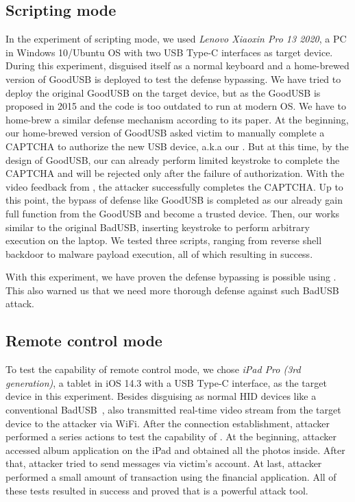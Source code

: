 \subsection{Scripting mode}
In the experiment of scripting mode, we used \textit{Lenovo Xiaoxin Pro 13 2020}, a PC in Windows 10/Ubuntu OS with two USB Type-C interfaces as target device.
During this experiment, \tool disguised itself as a normal keyboard and a home-brewed version of GoodUSB\cite{tian2015defending} is deployed to test the defense bypassing. We have tried to deploy the original GoodUSB on the target device, but as the GoodUSB is proposed in 2015 and the code is too outdated to run at modern OS. We have to home-brew a similar defense mechanism according to its paper.
At the beginning, our home-brewed version of GoodUSB asked victim to manually complete a CAPTCHA to  authorize the new USB device, a.k.a our \tool. But at this time, by the design of GoodUSB, our \tool can already perform limited keystroke to complete the CAPTCHA and will be rejected only after the failure of authorization. With the video feedback from \tool, the attacker successfully completes the CAPTCHA.
Up to this point, the bypass of defense like GoodUSB is completed as our \tool already gain full function from the GoodUSB and become a trusted device. Then, our \tool works similar to the original BadUSB, inserting keystroke to perform arbitrary execution on the laptop. We tested three scripts, ranging from reverse shell backdoor to malware payload execution, all of which resulting in success.

With this experiment, we have proven the defense bypassing is possible using \tool. This also warned us that we need more thorough defense against such BadUSB attack.

\subsection{Remote control mode}
To test the capability of remote control mode, we chose \textit{iPad Pro (3rd generation)}, a tablet in iOS 14.3 with a USB Type-C interface, as the target device in this experiment.
Besides disguising as normal HID devices like a conventional BadUSB~\cite{badusb}, \tool also transmitted real-time video stream from the target device to the attacker via WiFi.
After the connection establishment, attacker performed a series actions to test the capability of \tool. At the beginning, attacker accessed album application on the iPad and obtained all the photos inside. After that, attacker tried to send messages via victim's account. At last, attacker performed a small amount of transaction using the financial application. All of these tests resulted in success and proved that \tool is a powerful attack tool.

